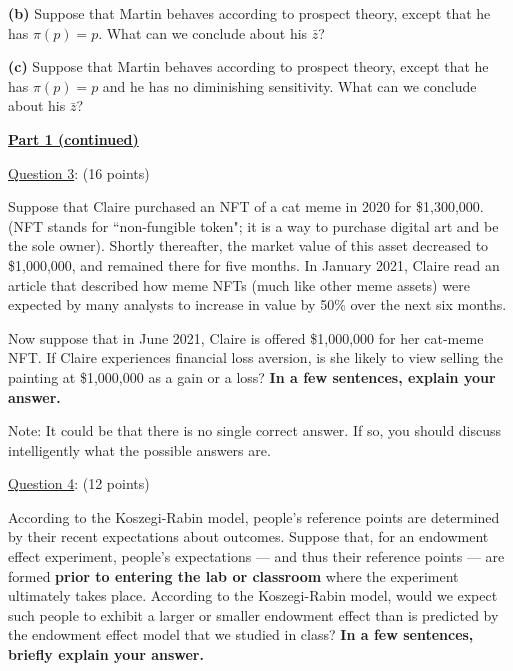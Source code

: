 \documentclass[12pt]{article}
\theoremstyle{definition}
\begin{document}
\textbf{(b)} Suppose that Martin behaves according to prospect theory,
except that he has $\pi (p)=p$. What can we conclude about his $\bar{z}$?

\textbf{(c)} Suppose that Martin behaves according to prospect theory,
except that he has $\pi (p)=p$ and he has no diminishing sensitivity. What
can we conclude about his $\bar{z}$?

\vspace*{.5in}

\pagebreak

\begin{center}
\underline{\textbf{Part 1 (continued)}}
\end{center}

\vspace*{0.5in}

\underline{Question 3}: (16 points)

Suppose that Claire purchased an NFT of a cat meme in 2020 for \$1,300,000. (NFT stands for ``non-fungible token"; it is a way to purchase digital art and be the sole owner).  Shortly thereafter, the market value of this asset decreased to
\$1,000,000, and remained there for five months. In January 2021, Claire read
an article that described how meme NFTs (much like other meme assets) were expected by many analysts to increase in
value by 50\% over the next six months.

Now suppose that in June 2021, Claire is offered \$1,000,000 for her cat-meme NFT. If Claire experiences financial loss aversion, is she likely to
view selling the painting at \$1,000,000 as a gain or a loss? \textbf{In a few sentences, explain your
answer.}

Note: It could be that there is no single correct answer. If so, you should
discuss intelligently what the possible answers are.

\bigskip

\underline{Question 4}: (12 points)

According to the Koszegi-Rabin model, people's reference points are
determined by their recent expectations about outcomes. Suppose that, for an
endowment effect experiment, people's expectations --- and thus their
reference points --- are formed \textbf{prior to entering the lab or classroom} where the experiment ultimately takes place. According to the
Koszegi-Rabin model, would we expect such people to exhibit a larger or
smaller endowment effect than is predicted by the endowment effect model
that we studied in class? \textbf{In a few sentences, briefly explain your answer.}
\end{document}
